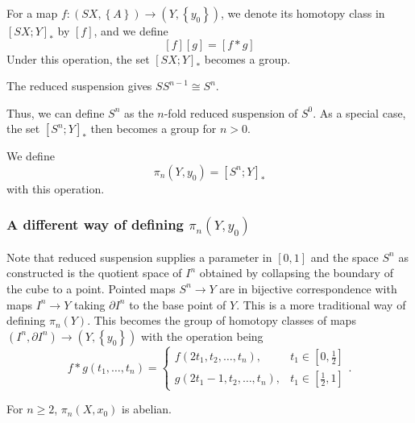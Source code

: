   For a map $f \colon \left( SX, \left\{ A \right\}  \right) 
  \to \left( Y, \left\{ y_0 \right\}  \right) $, we denote its
  homotopy class in
  $\left[ SX; Y \right]_{*}$ by
  $\left[ f \right] $, and we define
  \[
  \left[ f \right] \left[ g \right] =
  \left[ f*g\right] 
  \] 
  Under this operation, the set
  $\left[ SX;Y \right]_*$ becomes a group.

  \begin{proposition}[]
      The reduced suspension gives
      $S S^{n-1}\cong S^{n}$.
  \end{proposition}

  Thus, we can define $S^{n}$ as the $n$-fold reduced
  suspension of $S^{0}$. As a special case,
  the set $\left[ S^{n};Y \right]_*$ then becomes
  a group for $n>0$. 

  \begin{definition}
      We define
      \[
      \pi_n \left( Y, y_0 \right) =
      \left[ S^{n}; Y \right]_*
      \] 
      with this operation.
  \end{definition}

  \subsubsection{A different way of defining
  $\pi_n \left( Y, y_0 \right) $}
  Note that reduced suspension supplies a parameter in
  $\left[ 0,1 \right] $ and the space
  $S^{n}$ as constructed is the quotient space of
  $I^{n}$ obtained by collapsing the boundary of the cube to a
  point.
  Pointed maps $S^{n}\to Y$ are in bijective correspondence
  with maps $I^{n}\to Y$ taking $\partial I^{n}$ to
  the base point of $Y$. This is a more traditional way
  of defining $\pi_n(Y)$. This becomes the group
  of homotopy classes of maps
  $\left( I^{n},\partial I^{n} \right) \to 
  \left( Y, \left\{ y_0 \right\}  \right) $ with the
  operation being
  \[
  f*g \left( t_1, \ldots, t_n \right) =
  \begin{cases}
      f\left( 2t_1, t_2, \ldots, t_n \right) ,& t_1 \in 
      \left[ 0,\frac{1}{2} \right] \\
      g\left( 2t_1-1, t_2, \ldots, t_n \right) ,& t_1 \in 
      \left[ \frac{1}{2},1 \right] 
  \end{cases}.
  \] 

  \begin{proposition}[]
      For $n\ge 2$, $\pi_n\left( X, x_0 \right)$ is abelian.
  \end{proposition}

